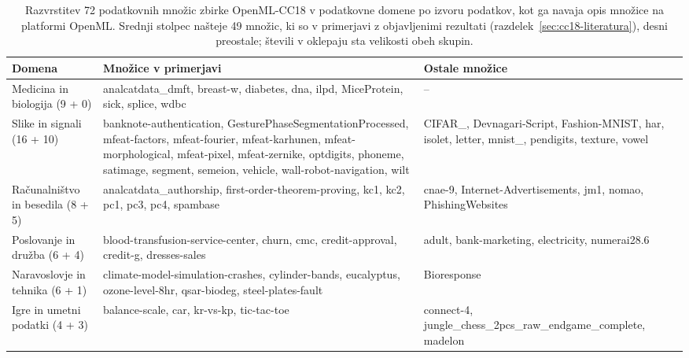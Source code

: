 \begin{table}[htbp]
\centering
\caption{Razvrstitev 72 podatkovnih množic zbirke OpenML-CC18 v podatkovne domene po izvoru podatkov, kot ga navaja opis množice na platformi OpenML. Srednji stolpec našteje 49 množic, ki so v primerjavi z objavljenimi rezultati (razdelek~\ref{sec:cc18-literatura}), desni preostale; števili v oklepaju sta velikosti obeh skupin.}
\label{tab:domene}
\scriptsize
\begin{tabular}{>{\raggedright\arraybackslash}p{2.3cm}>{\raggedright\arraybackslash}p{6.2cm}>{\raggedright\arraybackslash}p{3.9cm}}
\hline
Domena & Množice v primerjavi & Ostale množice \\
\hline
Medicina in biologija (9 + 0) & analcatdata\_\allowbreak dmft, breast-w, diabetes, dna, ilpd, Mice\allowbreak Protein, sick, splice, wdbc & -- \\
Slike in signali (16 + 10) & banknote-authentication, Gesture\allowbreak Phase\allowbreak Segmentation\allowbreak Processed, mfeat-factors, mfeat-fourier, mfeat-karhunen, mfeat-morphological, mfeat-pixel, mfeat-zernike, optdigits, phoneme, satimage, segment, semeion, vehicle, wall-robot-navigation, wilt & CIFAR\_\allowbreak 10, Devnagari-Script, Fashion-MNIST, har, isolet, letter, mnist\_\allowbreak 784, pendigits, texture, vowel \\
Računalništvo in besedila (8 + 5) & analcatdata\_\allowbreak authorship, first-order-theorem-proving, kc1, kc2, pc1, pc3, pc4, spambase & cnae-9, Internet-Advertisements, jm1, nomao, Phishing\allowbreak Websites \\
Poslovanje in družba (6 + 4) & blood-transfusion-service-center, churn, cmc, credit-approval, credit-g, dresses-sales & adult, bank-marketing, electricity, numerai28.6 \\
Naravoslovje in tehnika (6 + 1) & climate-model-simulation-crashes, cylinder-bands, eucalyptus, ozone-level-8hr, qsar-biodeg, steel-plates-fault & Bioresponse \\
Igre in umetni podatki (4 + 3) & balance-scale, car, kr-vs-kp, tic-tac-toe & connect-4, jungle\_\allowbreak chess\_\allowbreak 2pcs\_\allowbreak raw\_\allowbreak endgame\_\allowbreak complete, madelon \\
\hline
\end{tabular}
\end{table}
